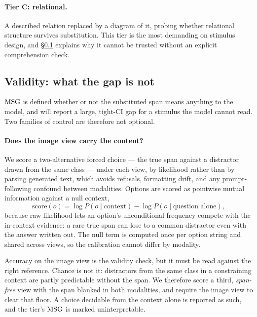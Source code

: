 \paragraph{Tier C: relational.} A described relation replaced by a diagram of
it, probing whether relational structure survives substitution. This tier is the
most demanding on stimulus design, and \S\ref{sec:validity} explains why it
cannot be trusted without an explicit comprehension check.

\subsection{Validity: what the gap is not}
\label{sec:validity}

$\mathrm{MSG}$ is defined whether or not the substituted span means anything to the
model, and will report a large, tight-CI gap for a stimulus the model cannot
read. Two families of control are therefore not optional.

\paragraph{Does the image view carry the content?}
We score a two-alternative forced choice --- the true span against a distractor
drawn from the same class --- under each view, by likelihood rather than by
parsing generated text, which avoids refusals, formatting drift, and any
prompt-following confound between modalities. Options are scored as pointwise
mutual information against a null context,
\begin{equation}
    \text{score}(o) = \log P(o \mid \text{context}) - \log P(o \mid \text{question alone}),
\end{equation}
because raw likelihood lets an option's unconditional frequency compete with the
in-context evidence: a rare true span can lose to a common distractor even with
the answer written out. The null term is computed once per option string and
shared across views, so the calibration cannot differ by modality.

Accuracy on the image view is the validity check, but it must be read against
the right reference. Chance is not it: distractors from the same class in a
constraining context are partly predictable without the span. We therefore score
a third, \emph{span-free} view with the span blanked in both modalities, and
require the image view to clear that floor. A choice decidable from the context
alone is reported as such, and the tier's $\mathrm{MSG}$ is marked uninterpretable.

